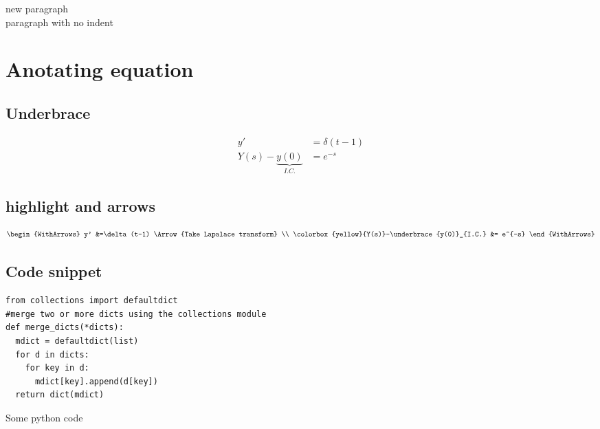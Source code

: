 \documentclass{article}
\begin{document}
new paragraph\\

\noindent paragraph with no indent
\vfill
\lipsum[1]

\newpage

\section{Anotating equation}
\subsection{Underbrace}
\begin{align}
    y' &=\delta(t-1) \\
    Y(s)-\underbrace{y(0)}_{I.C.} &= e^{-s}
\end{align}

\subsection{highlight and arrows }

\[\begin{WithArrows}
    y' &=\delta(t-1) \Arrow{Take Lapalace transform} \\
    \colorbox{yellow}{Y(s)}-\underbrace{y(0)}_{I.C.} &= e^{-s}
\end{WithArrows}\]
\subsection{Code snippet}

\begin{listing}
\begin{verbatim}
from collections import defaultdict
#merge two or more dicts using the collections module
def merge_dicts(*dicts):
  mdict = defaultdict(list)
  for d in dicts:
    for key in d:
      mdict[key].append(d[key])
  return dict(mdict)
\end{verbatim}
\caption{Some python code}
\end{listing}
\end{document}
